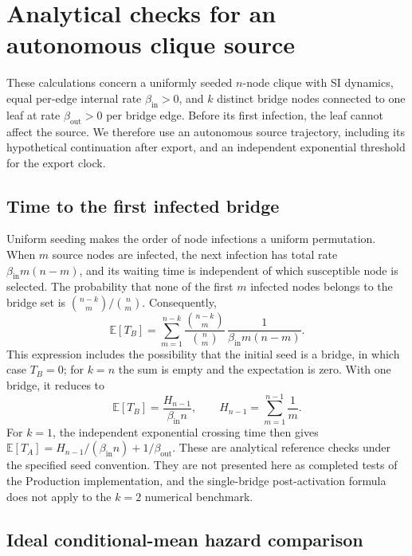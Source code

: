 \section{Analytical checks for an autonomous clique source}
\label{app:clique_analytic_checks}

These calculations concern a uniformly seeded $n$-node clique with SI dynamics, equal per-edge internal rate $\beta_{\mathrm{in}}>0$, and $k$ distinct bridge nodes connected to one leaf at rate $\beta_{\mathrm{out}}>0$ per bridge edge. Before its first infection, the leaf cannot affect the source. We therefore use an autonomous source trajectory, including its hypothetical continuation after export, and an independent exponential threshold for the export clock.

\subsection{Time to the first infected bridge}

Uniform seeding makes the order of node infections a uniform permutation. When $m$ source nodes are infected, the next infection has total rate $\beta_{\mathrm{in}}m(n-m)$, and its waiting time is independent of which susceptible node is selected. The probability that none of the first $m$ infected nodes belongs to the bridge set is $\binom{n-k}{m}/\binom{n}{m}$. Consequently,
\[
\mathbb{E}[T_B]
=\sum_{m=1}^{n-k}
\frac{\binom{n-k}{m}}{\binom{n}{m}}\,
\frac{1}{\beta_{\mathrm{in}}m(n-m)}.
\]
This expression includes the possibility that the initial seed is a bridge, in which case $T_B=0$; for $k=n$ the sum is empty and the expectation is zero. With one bridge, it reduces to
\[
\mathbb{E}[T_B]=\frac{H_{n-1}}{\beta_{\mathrm{in}}n},
\qquad
H_{n-1}=\sum_{m=1}^{n-1}\frac{1}{m}.
\]
For $k=1$, the independent exponential crossing time then gives
$\mathbb{E}[T_A]=H_{n-1}/(\beta_{\mathrm{in}}n)+1/\beta_{\mathrm{out}}$.
These are analytical reference checks under the specified seed convention. They are not presented here as completed tests of the Production implementation, and the single-bridge post-activation formula does not apply to the $k=2$ numerical benchmark.

\subsection{Ideal conditional-mean hazard comparison}
\label{app:clique_jensen}


